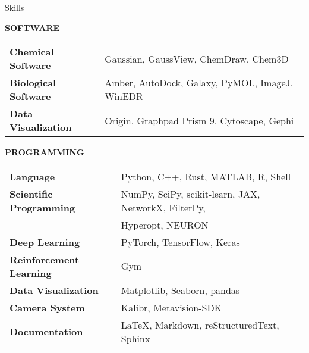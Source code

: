 \begin{rSection}{Skills}

    \textbf{SOFTWARE}
    
    \begin{tabular}{m{7cm} m{15cm}}
        \hspace{2em} \textbf{Chemical Software} & Gaussian, GaussView, ChemDraw, Chem3D \\ 
        \hspace{2em} \textbf{Biological Software} & Amber, AutoDock, Galaxy, PyMOL, ImageJ, WinEDR \\ 
        \hspace{2em} \textbf{Data Visualization} & Origin, Graphpad Prism 9, Cytoscape, Gephi
    \end{tabular}
    
    \textbf{PROGRAMMING}
    
    \begin{tabular}{m{7cm} m{15cm}}
        \hspace{2em} \textbf{Language} & Python, C++, Rust, MATLAB, R, Shell \\ 
        \hspace{2em} \textbf{Scientific Programming} & NumPy, SciPy, scikit-learn, JAX, NetworkX, FilterPy, \\
                                        & Hyperopt, NEURON \\
        \hspace{2em} \textbf{Deep Learning} & PyTorch, TensorFlow, Keras \\
        \hspace{2em} \textbf{Reinforcement Learning} & Gym \\
        \hspace{2em} \textbf{Data Visualization} & Matplotlib, Seaborn, pandas \\
        \hspace{2em} \textbf{Camera System} & Kalibr, Metavision-SDK \\
        \hspace{2em} \textbf{Documentation} & LaTeX, Markdown, reStructuredText, Sphinx 
    \end{tabular}
    
\end{rSection}